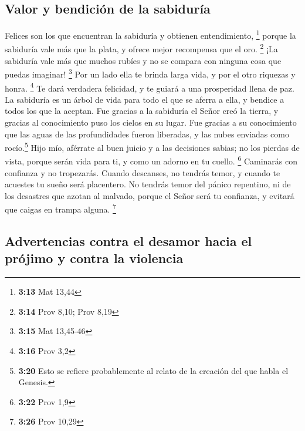 \hypertarget{valor-y-bendiciuxf3n-de-la-sabiduruxeda}{%
\subsection{Valor y bendición de la
sabiduría}\label{valor-y-bendiciuxf3n-de-la-sabiduruxeda}}

 Felices son los que encuentran la sabiduría y obtienen
entendimiento, \footnote{\textbf{3:13} Mat 13,44}  porque
la sabiduría vale más que la plata, y ofrece mejor recompensa que el
oro. \footnote{\textbf{3:14} Prov 8,10; Prov 8,19}  ¡La
sabiduría vale más que muchos rubíes y no se compara con ninguna cosa
que puedas imaginar! \footnote{\textbf{3:15} Mat 13,45-46}
 Por un lado ella te brinda larga vida, y por el otro
riquezas y honra. \footnote{\textbf{3:16} Prov 3,2}  Te
dará verdadera felicidad, y te guiará a una prosperidad llena de paz.
 La sabiduría es un árbol de vida para todo el que se
aferra a ella, y bendice a todos los que la aceptan.  Fue
gracias a la sabiduría el Señor creó la tierra, y gracias al
conocimiento puso los cielos en su lugar.  Fue gracias a
su conocimiento que las aguas de las profundidades fueron liberadas, y
las nubes enviadas como rocío.\footnote{\textbf{3:20} Esto se refiere
  probablemente al relato de la creación del que habla el Genesis.}
 Hijo mío, aférrate al buen juicio y a las decisiones
sabias; no los pierdas de vista,  porque serán vida para
ti, y como un adorno en tu cuello. \footnote{\textbf{3:22} Prov 1,9}
 Caminarás con confianza y no tropezarás. 
Cuando descanses, no tendrás temor, y cuando te acuestes tu sueño será
placentero.  No tendrás temor del pánico repentino, ni de
los desastres que azotan al malvado,  porque el Señor
será tu confianza, y evitará que caigas en trampa alguna. \footnote{\textbf{3:26}
  Prov 10,29}

\hypertarget{advertencias-contra-el-desamor-hacia-el-pruxf3jimo-y-contra-la-violencia}{%
\subsection{Advertencias contra el desamor hacia el prójimo y contra la
violencia}\label{advertencias-contra-el-desamor-hacia-el-pruxf3jimo-y-contra-la-violencia}}

